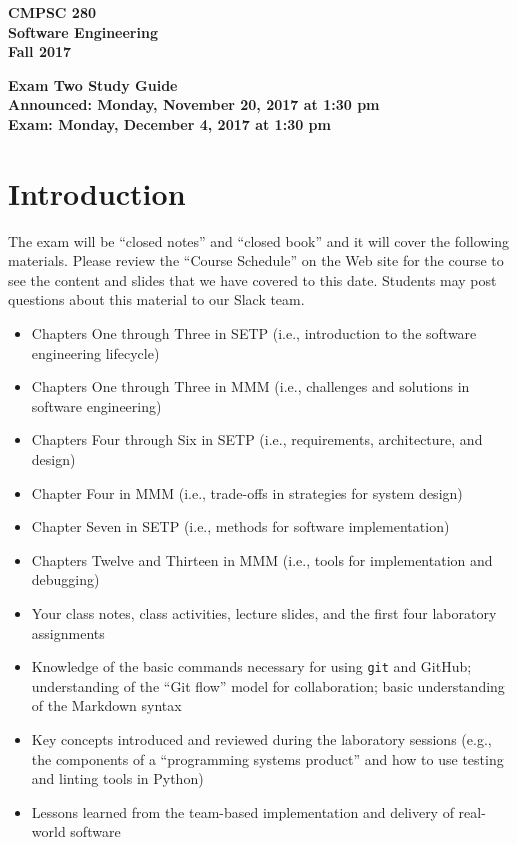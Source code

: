 \documentclass[11pt]{article}
\newcommand{\assignmentduedate}{December 4}
\newcommand{\assignmentassignedate}{November 20}
\newcommand{\assignmentnumber}{Two}
\newcommand{\labyear}{2017}
\newcommand{\assignedday}{Monday}
\newcommand{\dueday}{Monday}
\newcommand{\labtime}{1:30 pm}
\newcommand{\assigneddate}{Announced: \assignedday, \assignmentassignedate, \labyear{} at \labtime{}}
\newcommand{\duedate}{Exam: \dueday, \assignmentduedate, \labyear{} at \labtime{}}
\newcommand{\guidetitle}[1]
{
  \begin{center}
    \begin{center}
      \bf
      CMPSC 280\\Software Engineering\\
      Fall 2017\\
      \medskip
    \end{center}
    \bf
    #1
  \end{center}
}
\begin{document}
\thispagestyle{empty}

\guidetitle{Exam \assignmentnumber{} Study Guide \\ \assigneddate{} \\ \duedate{}}

\section*{Introduction}

\noindent
The exam will be ``closed notes'' and ``closed book'' and it will cover the
following materials. Please review the ``Course Schedule'' on the Web site for
the course to see the content and slides that we have covered to this date.
Students may post questions about this material to our Slack team.

\begin{itemize}

  \itemsep 0in

  \item Chapters One through Three in SETP (i.e., introduction to the software
    engineering lifecycle)

  \item Chapters One through Three in MMM (i.e., challenges and solutions in
    software engineering)

  \item Chapters Four through Six in SETP (i.e., requirements, architecture, and design)

  \item Chapter Four in MMM (i.e., trade-offs in strategies for system design)

  \item Chapter Seven in SETP (i.e., methods for software implementation)

  \item Chapters Twelve and Thirteen in MMM (i.e., tools for implementation and
    debugging)

  \item Your class notes, class activities, lecture slides, and the first four
    laboratory assignments

  \item Knowledge of the basic commands necessary for using {\tt git} and
    GitHub; understanding of the ``Git flow'' model for collaboration; basic
    understanding of the Markdown syntax

  \item Key concepts introduced and reviewed during the laboratory sessions
    (e.g., the components of a ``programming systems product'' and how to use
    testing and linting tools in Python)

  \item Lessons learned from the team-based implementation and delivery of
    real-world software

\end{itemize}
\end{document}
